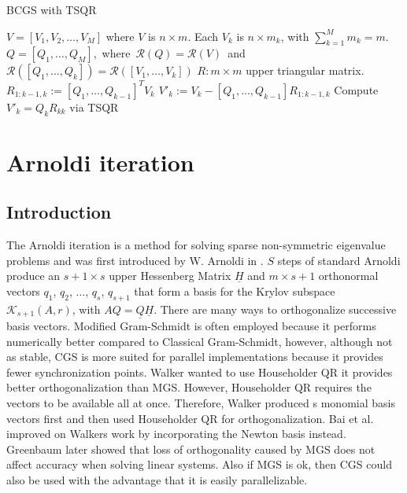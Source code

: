 \documentclass{scrartcl}
\begin{document}
\begin{algorithm}[H]
\caption{BCGS with TSQR}
\label{alg:bcgs}
\begin{algorithmic}[1]
    \REQUIRE $V = \left[V_1, V_2, \ldots, V_M\right]$ where $V$ is $n \times m$. Each $V_k$ is $n \times m_k$, with $\sum^M_{k=1}m_k = m$.
    \ENSURE \mbox{$Q = \left[Q_1, \ldots, Q_M\right]$, where $\mathcal{R}(Q) = \mathcal{R}(V)$ and $\mathcal{R}(\left[Q_1, \ldots, Q_k \right]) = \mathcal{R}(\left[V_1, \ldots, V_k \right])$}
    \ENSURE $R: m \times m$ upper triangular matrix.
    	\STATE $R_{1:k-1,k} := [Q_1, \ldots, Q_{k - 1}]^TV_k$
    	\STATE $V'_k := V_k - [Q_1, \ldots, Q_{k - 1}]R_{1:k - 1, k}$
    	\STATE Compute $V'_k = Q_kR_{kk}$ via TSQR
    \ENDFOR
\end{algorithmic}
\end{algorithm}

\section{Arnoldi iteration}
\subsection{Introduction}

The Arnoldi iteration is a method for solving sparse non-symmetric eigenvalue problems and was first introduced by W. Arnoldi in \cite{arnoldi:hal-01712943}. $S$ steps of standard Arnoldi produce an $s + 1 \times s$ upper Hessenberg Matrix $\underline{H}$ and $m \times s + 1$ orthonormal vectors $q_1$, $q_2$, $\ldots$, $q_s$, $q_{s + 1}$ that form a basis for the Krylov subspace $\mathcal{K}_{s + 1}(A, r)$, with $AQ = \underline{Q} \underline{H}$. There are many ways to orthogonalize successive basis vectors. Modified Gram-Schmidt is often employed because it performs numerically better compared to Classical Gram-Schmidt, however, although not as stable, CGS is more suited for parallel implementations because it provides fewer synchronization points.
Walker wanted to use Householder QR it provides better orthogonalization than MGS. However, Householder QR requires the vectors to be available all at once. Therefore, Walker produced s monomial basis vectors first and then used Householder QR for orthogonalization. Bai et al. improved on Walkers work by incorporating the Newton basis instead. Greenbaum later showed that loss of orthogonality caused by MGS does not affect accuracy when solving linear systems. Also if MGS is ok, then CGS could also be used with the advantage that it is easily parallelizable.
\end{document}
